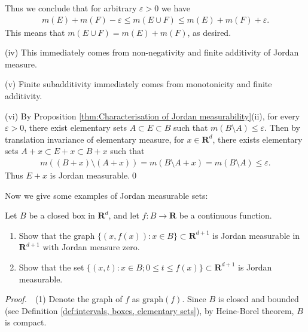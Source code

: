 \documentclass{book}
\theoremstyle{defstyle}
\theoremstyle{thmstyle}
\newcommand{\pff}{\noindent\emph{Proof.}~~}
\newcommand{\newa}{\vspace{1em}\indent}
\newcounter{Proposition}[section]
\begin{document}
Thus we conclude that for arbitrary $\varepsilon > 0$ we have
    \begin{align*}
        m(E) + m(F) - \varepsilon
        \leq m(E \cup F)
        \leq m(E) + m(F) + \varepsilon.
    \end{align*}
This means that $m(E \cup F) = m(E) + m(F)$, as desired.

(iv) This immediately comes from non-negativity and finite additivity of Jordan measure.

(v) Finite subadditivity immediately comes from monotonicity and finite additivity.

(vi) By Proposition \ref{thm:Characterisation of Jordan measurability}(ii), for every $\varepsilon > 0$, there exist elementary sets $A \subset E \subset B$ such that $m(B \setminus A) \leq \varepsilon$. Then by translation invariance of elementary measure, for $x \in \mathbf{R}^d$, there exists elementary sets $A + x \subset E + x \subset B + x$ such that
    \begin{align*}
        m((B + x) \setminus (A + x)) = m(B \setminus A + x) = m(B \setminus A) \leq \varepsilon.
    \end{align*}
Thus $E + x$ is Jordan measurable.\qed


\newa Now we give some examples of Jordan measurable sets:

\begin{example}\label{exe:regions under graphs are jordan measurable}
    Let $B$ be a closed box in $\mathbf{R}^d$, and let $f : B \to \mathbf{R}$ be a continuous function.
    \begin{enumerate}[label=(\arabic*)]
        \item Show that the graph $\{(x, f(x)) : x \in B\} \subset \mathbf{R}^{d + 1}$ is Jordan measurable in $\mathbf{R}^{d + 1}$ with Jordan measure zero.
        \item Show that the set $\{(x, t) : x \in B; 0 \leq t \leq f(x)\} \subset \mathbf{R}^{d + 1}$ is Jordan measurable.
    \end{enumerate}
\end{example}

\pff (1) Denote the graph of $f$ as $\text{graph}(f)$. Since $B$ is closed and bounded (see Definition \ref{def:intervals, boxes, elementary sets}), by Heine-Borel theorem, $B$ is compact.

\begin{comment}
Define $n$ as following:
    \begin{align*}
        N := \left\lfloor \frac{\max(B) - \min(B)}{\delta}\right\rfloor + 1
    \end{align*}
for $\delta > 0$. Let $x_1 = \min(B) + \delta$ and define $x_n := x_{n - 1} + 2\delta$, recursively, if $x_n \notin B$, define $x_n := \max(B)$.
\end{comment}
\end{document}
